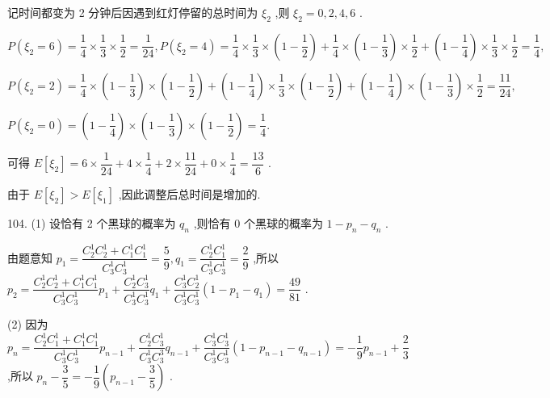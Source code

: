 记时间都变为 2 分钟后因遇到红灯停留的总时间为 ${\xi }_{2}$ ,则 ${\xi }_{2} = 0,2,4,6$ .

$P\left( {{\xi }_{2} = 6}\right)  = \dfrac{1}{4} \times  \dfrac{1}{3} \times  \dfrac{1}{2} = \dfrac{1}{24},P\left( {{\xi }_{2} = 4}\right)  = \dfrac{1}{4} \times  \dfrac{1}{3} \times  \left( {1 - \dfrac{1}{2}}\right)  + \dfrac{1}{4} \times  \left( {1 - \dfrac{1}{3}}\right)  \times  \dfrac{1}{2} + \left( {1 - \dfrac{1}{4}}\right)  \times  \dfrac{1}{3} \times  \dfrac{1}{2} = \dfrac{1}{4},$

$P\left( {{\xi }_{2} = 2}\right)  = \dfrac{1}{4} \times  \left( {1 - \dfrac{1}{3}}\right)  \times  \left( {1 - \dfrac{1}{2}}\right)  + \left( {1 - \dfrac{1}{4}}\right)  \times  \dfrac{1}{3} \times  \left( {1 - \dfrac{1}{2}}\right)  + \left( {1 - \dfrac{1}{4}}\right)  \times  \left( {1 - \dfrac{1}{3}}\right)  \times  \dfrac{1}{2} = \dfrac{11}{24},$

$P\left( {{\xi }_{2} = 0}\right)  = \left( {1 - \dfrac{1}{4}}\right)  \times  \left( {1 - \dfrac{1}{3}}\right)  \times  \left( {1 - \dfrac{1}{2}}\right)  = \dfrac{1}{4}.$

可得 $E\left\lbrack  {\xi }_{2}\right\rbrack   = 6 \times  \dfrac{1}{24} + 4 \times  \dfrac{1}{4} + 2 \times  \dfrac{11}{24} + 0 \times  \dfrac{1}{4} = \dfrac{13}{6}$ .

由于 $E\left\lbrack  {\xi }_{2}\right\rbrack   > E\left\lbrack  {\xi }_{1}\right\rbrack$ ,因此调整后总时间是增加的.

104. (1) 设恰有 2 个黑球的概率为 ${q}_{n}$ ,则恰有 0 个黑球的概率为 $1 - {p}_{n} - {q}_{n}$ .

由题意知 ${p}_{1} = \dfrac{{C}_{2}^{1}{C}_{2}^{1} + {C}_{1}^{1}{C}_{1}^{1}}{{C}_{3}^{1}{C}_{3}^{1}} = \dfrac{5}{9},{q}_{1} = \dfrac{{C}_{2}^{1}{C}_{1}^{1}}{{C}_{3}^{1}{C}_{3}^{1}} = \dfrac{2}{9}$ ,所以 ${p}_{2} = \dfrac{{C}_{2}^{1}{C}_{2}^{1} + {C}_{1}^{1}{C}_{1}^{1}}{{C}_{3}^{1}{C}_{3}^{1}}{p}_{1} + \dfrac{{C}_{2}^{1}{C}_{3}^{1}}{{C}_{3}^{1}{C}_{3}^{1}}{q}_{1} + \dfrac{{C}_{3}^{1}{C}_{2}^{1}}{{C}_{3}^{1}{C}_{3}^{1}}\left( {1 - {p}_{1} - {q}_{1}}\right)  = \dfrac{49}{81}$ .

(2) 因为 ${p}_{n} = \dfrac{{C}_{2}^{1}{C}_{1}^{1} + {C}_{1}^{1}{C}_{1}^{1}}{{C}_{3}^{1}{C}_{3}^{1}}{p}_{n - 1} + \dfrac{{C}_{2}^{1}{C}_{3}^{1}}{{C}_{3}^{1}{C}_{3}^{3}}{q}_{n - 1} + \dfrac{{C}_{3}^{1}{C}_{3}^{1}}{{C}_{3}^{1}{C}_{3}^{1}}\left( {1 - {p}_{n - 1} - {q}_{n - 1}}\right)  =  - \dfrac{1}{9}{p}_{n - 1} + \dfrac{2}{3}$ ,所以 ${p}_{n} - \dfrac{3}{5} =  - \dfrac{1}{9}\left( {{p}_{n - 1} - \dfrac{3}{5}}\right)$ .

